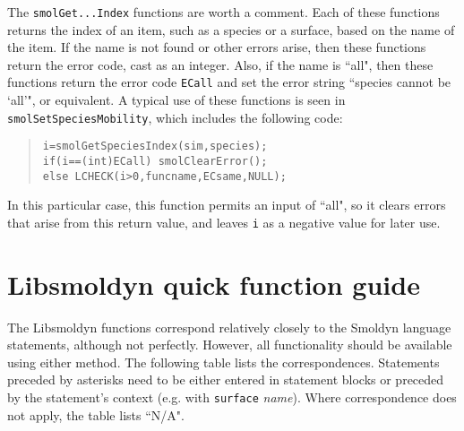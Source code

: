 \documentclass {book}
\begin{document}
The \texttt{smolGet...Index} functions are worth a comment. Each of these functions returns the index of an item, such as a species or a surface, based on the name of the item. If the name is not found or other errors arise, then these functions return the error code, cast as an integer. Also, if the name is ``all", then these functions return the error code \texttt{ECall} and set the error string ``species cannot be `all'", or equivalent. A typical use of these functions is seen in \texttt{smolSetSpeciesMobility}, which includes the following code:

\begin{quote}
\begin{lstlisting}
i=smolGetSpeciesIndex(sim,species);
if(i==(int)ECall) smolClearError();
else LCHECK(i>0,funcname,ECsame,NULL);
\end{lstlisting}
\end{quote}

In this particular case, this function permits an input of ``all", so it clears errors that arise from this return value, and leaves \texttt{i} as a negative value for later use.


\chapter{Libsmoldyn quick function guide}
The Libsmoldyn functions correspond relatively closely to the Smoldyn language statements, although not perfectly. However, all functionality should be available using either method. The following table lists the correspondences. Statements preceded by asterisks need to be either entered in statement blocks or preceded by the statement's context (e.g. with \texttt{surface} \emph{name}). Where correspondence does not apply, the table lists ``N/A".
\end{document}
